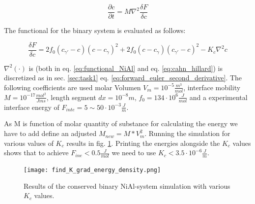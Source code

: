 \begin{equation}
	\frac{ \partial c}{ \partial t} = M \nabla^{2} \frac{\delta F}{\delta c} \label{eq:cahn_hillard}
\end{equation} 

The functional for the binary system is evaluated as follows:

\begin{equation}
	\frac{\delta F}{\delta c} = 2 f_{0}(c_{\gamma '} - c )(c - c_{\gamma})^2 + 2 f_{0} (c - c_{\gamma})(c_{\gamma '} - c )^{2} - K_{c} \nabla^{2} c  \label{eq:functional_NiAl}
\end{equation}
		
\(\nabla^{2}(\cdot)\) is (both in eq. \ref{eq:functional_NiAl} and eq. \ref{eq:cahn_hillard}) is discretized as in sec. \ref{sec:task1} eq. \ref{eq:forward_euler_second_derivative}.  The following coefficients are used molar Volumen \(V_{m} = 10^{-5} \frac{m^{3}}{mol}\), interface mobility \(M = 10^{-17} \frac{mol^{2}}{J m s}\), length segment \(dx = 10^{-8} m\), \(f_{0} = 134 \cdot 10^{6} \frac{J}{mol}\) and a experimental interface energy of \( F_{inte} = 5 \sim 50 \cdot 10^{-3} \frac{J}{m}\). 

As M is function of molar quantity of substance for calculating the energy we have to add define an adjusted \( M_{new} = M * V_{m}^{2}\). Running the simulation for various values of \(K_{c}\) results in fig. \ref{fig:vary_K}. Printing the energies alongside the \(K_{c}\) values shows that to achieve \(F_{ine} < 0.5 \frac{J}{mol}\) we need to use \(K_{c} < 3.5 \cdot 10^{-6} \frac{J}{m}\).

\begin{figure}[htb]
	\centering
	\texttt{[image: find\_K\_grad\_energy\_density.png]} \label{fig:vary_K}
	\caption{Results of the conserved binary NiAl-system simulation with various \(K_{c}\) values.}
\end{figure}




\printbibliography




